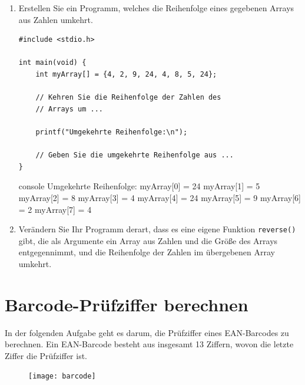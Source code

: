 \begin{enumerate}
    \item Erstellen Sie ein Programm, welches die Reihenfolge eines gegebenen
    Arrays aus Zahlen umkehrt.

\Vorlage
\begin{verbatim}
#include <stdio.h>

int main(void) {
    int myArray[] = {4, 2, 9, 24, 4, 8, 5, 24};

    // Kehren Sie die Reihenfolge der Zahlen des
    // Arrays um ...

    printf("Umgekehrte Reihenfolge:\n");

    // Geben Sie die umgekehrte Reihenfolge aus ...
}
\end{verbatim}

\begin{mybox}[Bildschirmausgabe]{console}
Umgekehrte Reihenfolge:
myArray[0] = 24
myArray[1] = 5
myArray[2] = 8
myArray[3] = 4
myArray[4] = 24
myArray[5] = 9
myArray[6] = 2
myArray[7] = 4
\end{mybox}

  \item Verändern Sie Ihr Programm derart, dass es eine eigene Funktion
  \texttt{reverse()} gibt, die als Argumente ein Array aus Zahlen und die
  Größe des Arrays entgegennimmt, und die Reihenfolge der Zahlen im übergebenen
  Array umkehrt.
\end{enumerate}



\chapter{Barcode-Prüfziffer berechnen}

\vspace{10pt}

In der folgenden Aufgabe geht es darum, die Prüfziffer eines EAN-Barcodes zu
berechnen. Ein EAN-Barcode besteht aus insgesamt 13 Ziffern, wovon die letzte
Ziffer die Prüfziffer ist.

\begin{figure}[htb!]
\centering
\texttt{[image: barcode]}
\end{figure}

